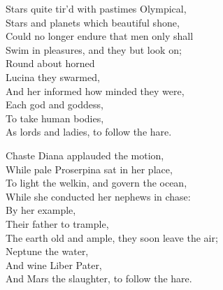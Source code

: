 
\bigskip


\settowidth{\versewidth}{The earth old and ample, they soon leave the air;}
\begin{dcverse}\begin{patverse}
Stars quite tir’d with pastimes Olympical,\\
Stars and planets which beautiful shone,\\
Could no longer endure that men only shall\\
Swim in pleasures, and they but look on;\\
Round about horned\\
Lucina they swarmed,\\
And her informed how minded they were,\\
Each god and goddess,\\
To take human bodies,\\
As lords and ladies, to follow the hare.
\end{patverse}
\columnbreak

\begin{patverse}
Chaste Diana applauded the motion,\\
While pale Proserpina sat in her place,\\
To light the welkin, and govern the ocean,\\
While she conducted her nephews in chase:\\
By her example,\\
Their father to trample,\\
The earth old and ample, they soon leave the air;\\
Neptune the water,\\
And wine Liber Pater,\\
And Mars the slaughter, to follow the hare.
\end{patverse}
\end{dcverse}
\pagebreak

